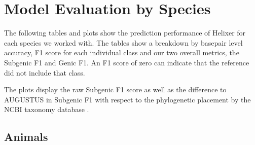 \documentclass{article}
\begin{document}
\section{Model Evaluation by Species}
\label{ssec:generalization}
The following tables and plots show the prediction performance of Helixer for each species we worked with. The tables show a breakdown by basepair level accuracy, F1 score for each individual class and our two overall metrics, the Subgenic F1 and Genic F1. An F1 score of zero can indicate that the reference did not include that class. 

The plots display the raw Subgenic F1 score as well as the difference to AUGUSTUS in Subgenic F1 with respect to the phylogenetic placement by the NCBI taxonomy database \citep{federhen2012ncbi}.

\subsection{Animals}
\newpage
\end{document}
